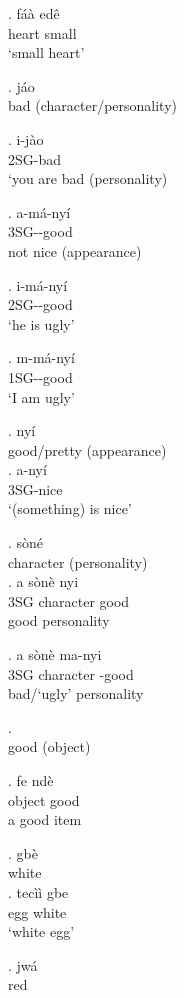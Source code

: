 \documentclass{assets/fieldnotes}
\begin{document}
\exg. fáà edê\\
heart small\\
`small heart'

\ex. jáo\\
bad (character/personality)

\exg. i-jào\\
2SG-bad\\
`you are bad (personality)

\exg. a-má-nyí\\
3SG-\Neg{}-good\\
not nice (appearance)

\exg. i-má-nyí\\
2SG-\Neg{}-good\\
`he is ugly'

\exg. m-má-nyí\\
1SG-\Neg{}-good\\
`I am ugly'

\ex. nyí\\
good/pretty (appearance)\\

\exg. a-nyí\\
3SG-nice\\
`(something) is nice'

\ex. sòné\\
character (personality)\\

\exg. a sònè nyi\\
3SG character good\\
good personality

\exg. a sònè ma-nyi\\
3SG character \Neg{}-good\\
bad/`ugly' personality

\ex. \\
good (object)

\exg. fe ndè\\
object good\\
a good item


\exg. gbè\\
white\\

\exg. tecìì gbe\\
egg white\\
`white egg'

\exg. jwá\\
red\\
\end{document}
